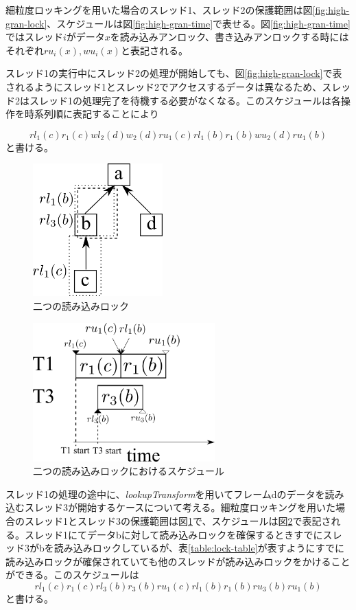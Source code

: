 \documentclass[a4paper]{jreport}	%
\begin{document}
細粒度ロッキングを用いた場合のスレッド1、スレッド2の保護範囲は図\ref{fig:high-gran-lock}、スケジュールは図\ref{fig:high-gran-time}で表せる。図\ref{fig:high-gran-time}ではスレッド$i$がデータ$x$を読み込みアンロック、書き込みアンロックする時にはそれぞれ$ru_i(x), wu_i(x)$と表記される。

スレッド1の実行中にスレッド2の処理が開始しても、図\ref{fig:high-gran-lock}で表されるようにスレッド1とスレッド2でアクセスするデータは異なるため、スレッド2はスレッド1の処理完了を待機する必要がなくなる。このスケジュールは各操作を時系列順に表記することにより

\begin{equation}
rl_1(c)r_1(c)wl_2(d)w_2(d)ru_1(c)rl_1(b)r_1(b)wu_2(d)ru_1(b)
\end{equation}
と書ける。


\begin{figure}[h] 
\centering
\includegraphics[width=5cm]{two-read-lock}
\caption{二つの読み込みロック}
\label{fig:two-read-lock}
\end{figure}


\begin{figure}[h] 
\centering
\includegraphics[width=7cm]{two-read-lock-time}
\caption{二つの読み込みロックにおけるスケジュール}
\label{fig:two-read-lock-time}
\end{figure}

スレッド1の処理の途中に、\textit{lookupTransform}を用いてフレームdのデータを読み込むスレッド3が開始するケースについて考える。細粒度ロッキングを用いた場合のスレッド1とスレッド3の保護範囲は図\ref{fig:two-read-lock}で、スケジュールは図\ref{fig:two-read-lock-time}で表記される。スレッド1にてデータbに対して読み込みロックを確保するときすでにスレッド3がbを読み込みロックしているが、表\ref{table:lock-table}が表すようにすでに読み込みロックが確保されていても他のスレッドが読み込みロックをかけることができる。このスケジュールは
\begin{equation}
	rl_1(c)r_1(c)rl_3(b)r_3(b)ru_1(c)rl_1(b)r_1(b)ru_3(b)ru_1(b)
\end{equation}
と書ける。
\end{document}
